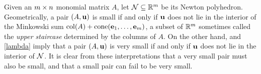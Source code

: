 \documentclass{amsart}
\begin{document}
\begin{remark}
\label{geometric small and very small: R}
Given an $m \times n$ monomial matrix $A$, let $\mathcal{N} \subseteq \mathbb{R}^{m}$ be its Newton polyhedron.
Geometrically, a pair $(A, \mathbf{u})$ is small if and only if $\mathbf{u}$ does not lie in the interior of the Minkowski sum $\operatorname{col}(A) + \operatorname{cone}(\mathbf{e}_1,\ldots,\mathbf{e}_m)$, a subset of $\mathbb{R}^{m}$ sometimes called the \emph{upper staircase} determined by the columns of $A$.
On the other hand,  and \ref{lambda} imply that a pair $(A, \mathbf{u})$ is very small if and only if $\mathbf{u}$ does not lie in the interior of $\mathcal{N}$.
It is clear from these interpretations that a very small pair must also be small, and that a small pair can fail to be very small.  %
\end{remark}
\end{document}
